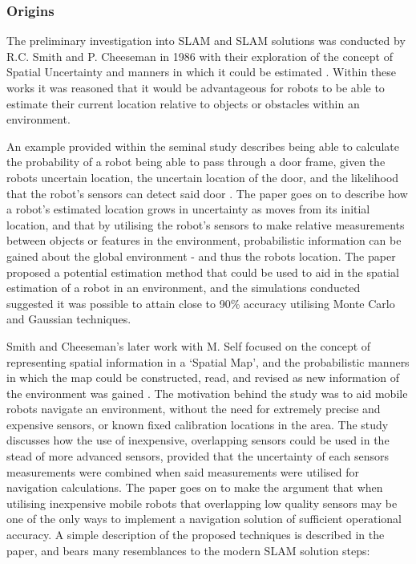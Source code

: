 \subsubsection{Origins}
The preliminary investigation into SLAM and SLAM solutions was conducted by
R.C. Smith and P. Cheeseman in 1986 with their exploration of the concept of
Spatial Uncertainty and manners in which it could be estimated
\cite{Smith1986,Smith1988}.
Within these works it was reasoned that it would be advantageous for robots to
be able to estimate their current location relative to objects or obstacles
within an environment.

An example provided within the seminal study describes being able to calculate
the probability of a robot being able to pass through a door frame, given the
robots uncertain location, the uncertain location of the door, and the
likelihood that the robot's sensors can detect said door \cite{Smith1986}. 
The paper goes on to describe how a robot's estimated location grows in
uncertainty as moves from its initial location, and that by utilising the
robot's sensors to make relative measurements between objects or features in the
environment, probabilistic information can be gained about the global
environment - and thus the robots location.
The paper proposed a potential estimation method that could be used to aid
in the spatial estimation of a robot in an environment, and the simulations
conducted suggested it was possible to attain close to 90\% accuracy utilising
Monte Carlo and Gaussian techniques.

Smith and Cheeseman's later work with M. Self focused on the concept of
representing spatial information in a `Spatial Map', and the probabilistic
manners in which the map could be constructed, read, and revised as new
information of the environment was gained \cite{Smith1988}.
The motivation behind the study was to aid mobile robots navigate an
environment, without the need for extremely precise and expensive sensors, or
known fixed calibration locations in the area.
The study discusses how the use of inexpensive, overlapping sensors could be
used in the stead of more advanced sensors, provided that the uncertainty of
each sensors measurements were combined when said measurements were utilised
for navigation calculations.
The paper goes on to make the argument that when utilising inexpensive mobile
robots that overlapping low quality sensors may be one of the only ways to
implement a navigation solution of sufficient operational accuracy.
A simple description of the proposed techniques is described in the paper, and
bears many resemblances to the modern SLAM solution steps:

